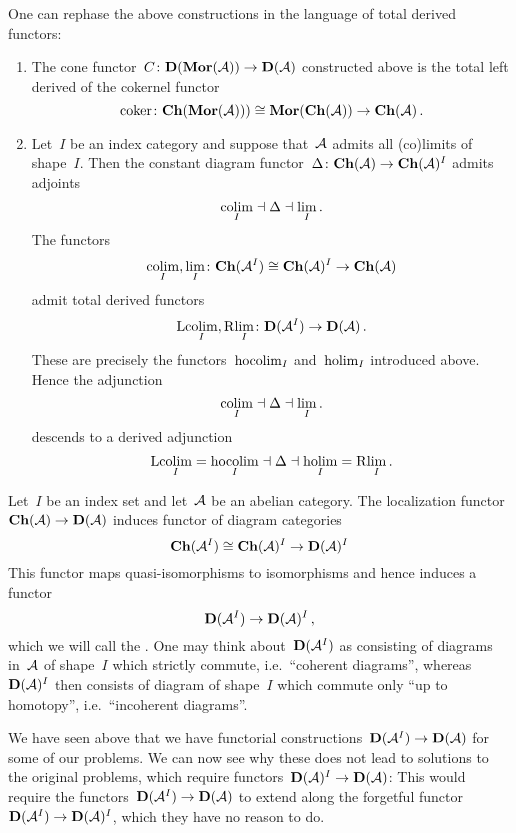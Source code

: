 \documentclass[a4paper,10pt]{scrartcl}
\begin{document}
One can rephase the above constructions in the language of total derived functors:
\pagebreak
\begin{example}
  \leavevmode
  \begin{enumerate}
    \item
      The cone functor~$C \colon \mathbf{D}(\mathbf{Mor}(\mathcal{A})) \to \mathbf{D}(\mathcal{A})$ constructed above is the total left derived of the cokernel functor
      \[
        \operatorname{coker}
        \colon
        \mathbf{Ch}(\mathbf{Mor}(\mathcal{A})))
        \cong
        \mathbf{Mor}(\mathbf{Ch}(\mathcal{A}))
        \to
        \mathbf{Ch}(\mathcal{A}) \,.
      \]
    \item
      Let~$I$ be an index category and suppose that~$\mathcal{A}$ admits all (co)limits of shape~$I$.
      Then the constant diagram functor~$\Delta \colon \mathbf{Ch}(\mathcal{A}) \to \mathbf{Ch}(\mathcal{A})^I$ admits adjoints
      \[
        {\operatorname*{colim}_I}
        \mathrel{\dashv}
        \Delta
        \mathrel{\dashv}
        {\lim_I} \,.
      \]
      The functors
      \[
        \operatorname*{colim}_I, \lim_I
        \colon
        \mathbf{Ch}(\mathcal{A}^I)
        \cong
        \mathbf{Ch}(\mathcal{A})^I
        \to
        \mathbf{Ch}(\mathcal{A})
      \]
      admit total derived functors
      \[
        \mathrm{L} {\operatorname*{colim}_I},
        \mathrm{R} {\lim_I}
        \colon
        \mathbf{D}(\mathcal{A}^I)
        \to
        \mathbf{D}(\mathcal{A}) \,.
      \]
      These are precisely the functors~$\operatorname*{hocolim}_I$ and~$\operatorname*{holim}_I$ introduced above.
      Hence the adjunction
      \[
        {\operatorname*{colim}_I}
        \mathrel{\dashv}
        \Delta
        \mathrel{\dashv}
        {\lim_I} \,.
      \]
      descends to a derived adjunction
      \[
        \mathrm{L} {\operatorname*{colim}_I}
        =
        \operatorname*{hocolim}_I
        \mathrel{\dashv}
        \Delta
        \mathrel{\dashv}
        \operatorname*{holim}_I
        =
        \mathrm{R} {\lim_I} \,.
      \]
  \end{enumerate}
\end{example}


\begin{remark}
  Let~$I$ be an index set and let~$\mathcal{A}$ be an abelian category.
  The localization functor~$\mathbf{Ch}(\mathcal{A}) \to \mathbf{D}(\mathcal{A})$ induces functor of diagram categories
  \[
    \mathbf{Ch}(\mathcal{A}^I)
    \cong
    \mathbf{Ch}(\mathcal{A})^I
    \to
    \mathbf{D}(\mathcal{A})^I
  \]
  This functor maps quasi-isomorphisms to isomorphisms and hence induces a functor
  \[
    \mathbf{D}(\mathcal{A}^I) \to \mathbf{D}(\mathcal{A})^I \,,
  \]
  which we will call the .
  One may think about~$\mathbf{D}(\mathcal{A}^I)$ as consisting of diagrams in~$\mathcal{A}$ of shape~$I$ which strictly commute, i.e.\ \enquote{coherent diagrams}, whereas~$\mathbf{D}(\mathcal{A})^I$ then consists of diagram of shape~$I$ which commute only \enquote{up to homotopy}, i.e.\ \enquote{incoherent diagrams}.
  
  We have seen above that we have functorial constructions~$\mathbf{D}(\mathcal{A}^I) \to \mathbf{D}(\mathcal{A})$ for some of our problems.
  We can now see why these does not lead to solutions to the original problems, which require functors~$\mathbf{D}(\mathcal{A})^I \to \mathbf{D}(\mathcal{A})$:
  This would require the functors~$\mathbf{D}(\mathcal{A}^I) \to \mathbf{D}(\mathcal{A})$ to extend along the forgetful functor~$\mathbf{D}(\mathcal{A}^I) \to \mathbf{D}(\mathcal{A})^I$, which they have no reason to do.
\end{remark}
\end{document}

